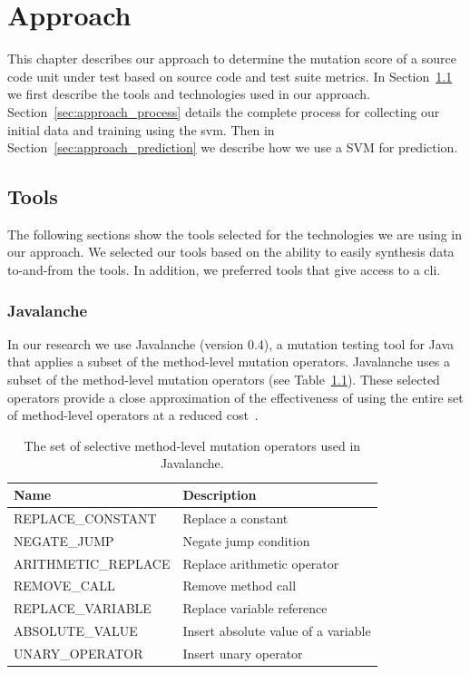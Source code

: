\chapter{Approach}
\label{chap:approach}
This chapter describes our approach to determine the mutation score of a source code unit under test based on source code and test suite metrics. In Section~\ref{sec:approach_tools} we first describe the tools and technologies used in our approach. Section~\ref{sec:approach_process} details the complete process for collecting our initial data and training using the \gls{svm}. Then in Section~\ref{sec:approach_prediction} we describe how we use a SVM for prediction.


\section{Tools}
\label{sec:approach_tools}
The following sections show the tools selected for the technologies we are using in our approach. We selected our tools based on the ability to easily synthesis data to-and-from the tools. In addition, we preferred tools that give access to a \gls{cli}.


\subsection{Javalanche}
\label{subsec:approach_javalanche}
In our research we use Javalanche (version 0.4), a mutation testing tool for Java~\cite{SZ09} that applies a subset of the method-level mutation operators. Javalanche uses a subset of the method-level mutation operators (see Table~\ref{tab:javalanche_operators}). These selected operators provide a close approximation of the effectiveness of using the entire set of method-level operators at a reduced cost~\cite{OLR+96}.

\begin{table}[h]
  \centering
  \begin{tabular}{|l|l|}
    \hline
    \rowcolor[RGB]{169,196,223}
    \textbf{Name} & \textbf{Description} \\
    \hline REPLACE\_CONSTANT & Replace a constant \\
    \hline NEGATE\_JUMP & Negate jump condition \\
    \hline ARITHMETIC\_REPLACE & Replace arithmetic operator \\
    \hline REMOVE\_CALL & Remove method call \\
    \hline REPLACE\_VARIABLE & Replace variable reference\\
    \hline ABSOLUTE\_VALUE & Insert absolute value of a variable \\
    \hline UNARY\_OPERATOR & Insert unary operator \\
    \hline
  \end{tabular}
  \caption{The set of selective method-level mutation operators used in Javalanche.}
  \label{tab:javalanche_operators}
\end{table}

